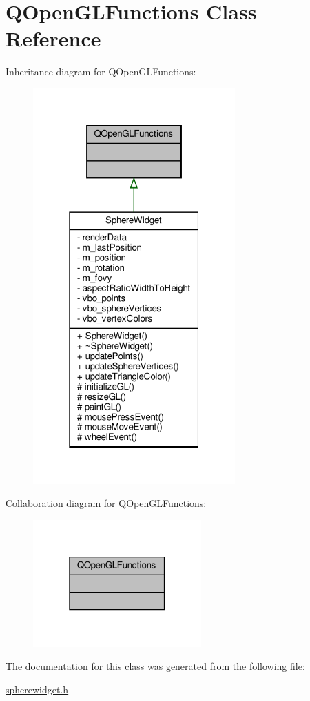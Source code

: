 \hypertarget{class_q_open_g_l_functions}{}\section{Q\+Open\+G\+L\+Functions Class Reference}
\label{class_q_open_g_l_functions}


Inheritance diagram for Q\+Open\+G\+L\+Functions\+:
\nopagebreak
\begin{figure}[H]
\begin{center}
\leavevmode
\includegraphics[width=220pt]{d5/d07/class_q_open_g_l_functions__inherit__graph}
\end{center}
\end{figure}


Collaboration diagram for Q\+Open\+G\+L\+Functions\+:
\nopagebreak
\begin{figure}[H]
\begin{center}
\leavevmode
\includegraphics[width=183pt]{d4/de3/class_q_open_g_l_functions__coll__graph}
\end{center}
\end{figure}


The documentation for this class was generated from the following file\+:\begin{DoxyCompactItemize}
\item 
\hyperlink{spherewidget_8h}{spherewidget.\+h}\end{DoxyCompactItemize}
